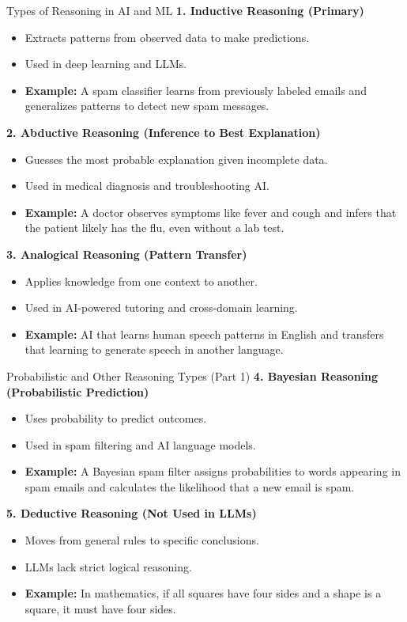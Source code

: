 \documentclass{beamer}
\begin{document}
\begin{frame}{Types of Reasoning in AI and ML}
    \textbf{1. Inductive Reasoning (Primary)}
    \begin{itemize}
        \item Extracts patterns from observed data to make predictions.
        \item Used in deep learning and LLMs.
        \item \textbf{Example:} A spam classifier learns from previously labeled emails and generalizes patterns to detect new spam messages.
    \end{itemize}

    \textbf{2. Abductive Reasoning (Inference to Best Explanation)}
    \begin{itemize}
        \item Guesses the most probable explanation given incomplete data.\@
        \item Used in medical diagnosis and troubleshooting AI.\@
        \item \textbf{Example:} A doctor observes symptoms like fever and cough and infers that the patient likely has the flu, even without a lab test.
    \end{itemize}

    \textbf{3. Analogical Reasoning (Pattern Transfer)}
    \begin{itemize}
        \item Applies knowledge from one context to another.
        \item Used in AI-powered tutoring and cross-domain learning.
        \item \textbf{Example:} AI that learns human speech patterns in English and transfers that learning to generate speech in another language.
    \end{itemize}
\end{frame}

\begin{frame}{Probabilistic and Other Reasoning Types (Part 1)}
    \textbf{4. Bayesian Reasoning (Probabilistic Prediction)}
    \begin{itemize}
        \item Uses probability to predict outcomes.
        \item Used in spam filtering and AI language models.
        \item \textbf{Example:} A Bayesian spam filter assigns probabilities to words appearing in spam emails and calculates the likelihood that a new email is spam.
    \end{itemize}

    \textbf{5. Deductive Reasoning (Not Used in LLMs)}
    \begin{itemize}
        \item Moves from general rules to specific conclusions.
        \item LLMs lack strict logical reasoning.
        \item \textbf{Example:} In mathematics, if all squares have four sides and a shape is a square, it must have four sides.
    \end{itemize}
\end{frame}
\end{document}
